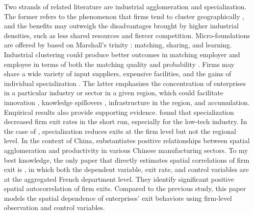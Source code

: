 Two strands of related literature are industrial agglomeration and specialization. The former refers to the phenomenon that firms tend to cluster geographically \cite{audretsch1996r,porter1998clusters}, and the benefits may outweigh the disadvantages brought by higher industrial densities, such as less shared resources and fiercer competition. Micro-foundations are offered by \cite{duranton2004micro} based on Marshall's trinity \cite{marshall2009principles}: matching, sharing, and learning. Industrial clustering could produce better outcomes in matching employer and employee in terms of both the matching quality and probability \cite{rosenthal2001determinants}. Firms may share a wide variety of input suppliers, expensive facilities, and the gains of individual specialization \cite{baumgardner1988division}. The latter emphasizes the concentration of enterprises in a particular industry or sector in a given region, which could facilitate innovation \cite{duranton2001nursery}, knowledge spillovers \cite{jovanovic1989growth}, infrastructure in the region, and accumulation. Empirical results also provide supporting evidence. \cite{cainelli2014spatial} found that specialization decreased firm exit rates in the short run, especially for the low-tech industry. In the case of \cite{power2019effect}, specialization reduces exits at the firm level but not the regional level. In the context of China, \cite{fan2003industrial} substantiates positive relationships between spatial agglomeration and productivity in various Chinese manufacturing sectors. To my best knowledge, the only paper that directly estimates spatial correlations of firm exit is \cite{arcuri2019spatial}, in which both the dependent variable, exit rate, and control variables are at the aggregated French department level. They identify significant positive spatial autocorrelation of firm exits. Compared to the previous study, this paper models the spatial dependence of enterprises' exit behaviors using firm-level observation and control variables.

